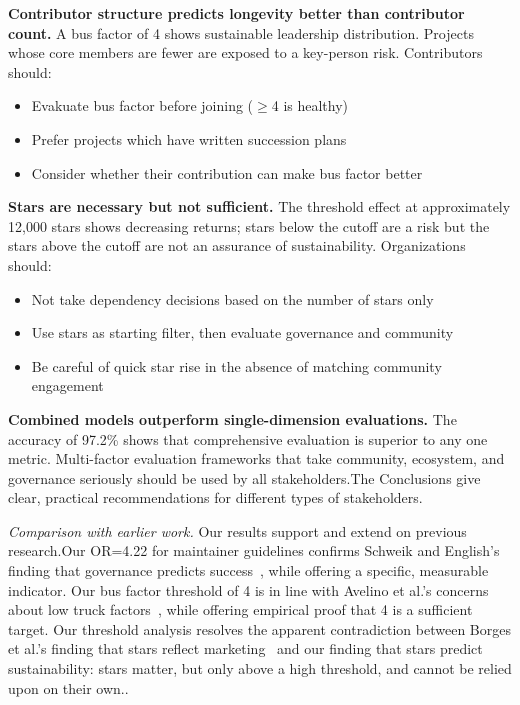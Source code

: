 \documentclass[conference]{IEEEtran}
\begin{document}
\textbf{Contributor structure predicts longevity better than contributor count.} A bus factor of 4 shows sustainable leadership distribution. Projects whose core members are fewer are exposed to a key-person risk. Contributors should:
\begin{itemize}
    \item Evakuate bus factor before joining ($\geq$4 is healthy)
    \item Prefer projects which have written succession plans
    \item Consider whether their contribution can make bus factor better
\end{itemize}

\textbf{Stars are necessary but not sufficient.} The threshold effect at approximately 12,000 stars shows decreasing returns; stars below the cutoff are a risk but the stars above the cutoff are not an assurance of sustainability. Organizations should:
\begin{itemize}
    \item Not take dependency decisions based on the number of stars only
    \item Use stars as starting filter, then evaluate governance and community
    \item Be careful of quick star rise in the absence of matching community engagement
\end{itemize}

\textbf{Combined models outperform single-dimension evaluations.}  The accuracy of  97.2\% shows that comprehensive evaluation  is superior to any one metric. Multi-factor evaluation frameworks that take community, ecosystem, and governance seriously should be used by all stakeholders.The Conclusions give clear, practical recommendations for different types of stakeholders.

\textit{Comparison with earlier work.}  Our results support and extend on previous research.Our OR=4.22 for maintainer guidelines confirms Schweik and English's finding that governance predicts success~\cite{schweik2012}, while offering a specific, measurable indicator. Our bus factor threshold of 4 is in line with Avelino et al.'s concerns about low truck factors~\cite{avelino2016}, while offering empirical proof that 4 is a sufficient target. Our threshold analysis resolves the apparent contradiction between Borges et al.'s finding that stars reflect marketing~\cite{borges2016} and our finding that stars predict sustainability: stars matter, but only above a high threshold, and cannot be relied upon on their own..
\end{document}
